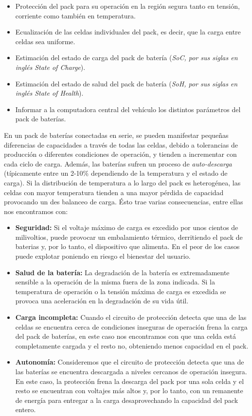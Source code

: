 \documentclass[10pt,a4paper]{article}
\begin{document}
\begin{itemize}
	\item Protección del pack para su operación en la región segura tanto en tensión, corriente como también en temperatura.
	\item Ecualización de las celdas individuales del pack, es decir, que la carga entre celdas sea uniforme.
	\item Estimación del estado de carga del pack de batería (\emph{SoC, por sus siglas en inglés State of Charge}).
	\item Estimación del estado de salud del pack de batería (\emph{SoH, por sus siglas en inglés State of Health}).
	\item Informar a la computadora central del vehículo los distintos parámetros del pack de baterías.
\end{itemize}

\noindent En un pack de baterías conectadas en serie, se pueden manifestar pequeñas diferencias de capacidades a través de todas las celdas, debido a tolerancias de producción o diferentes condiciones de operación, y tienden a incrementar con cada ciclo de carga. Además, las baterías sufren un proceso de \emph{auto-descarga} (típicamente entre un 2-10\% dependiendo de la temperatura y el estado de carga). Si la distribución de temperatura a lo largo del pack es heterogénea, las celdas con mayor temperatura tienden a una mayor pérdida de capacidad provocando un des balanceo de carga. Ésto trae varias consecuencias, entre ellas nos encontramos con:

\begin{itemize}
	\item \textbf{Seguridad:} Si el voltaje máximo de carga es excedido por unos cientos de milivoltios, puede provocar un embalamiento térmico, derritiendo el pack de baterias y, por lo tanto, el dispositivo que alimenta. En el peor de los casos puede explotar poniendo en riesgo el bienestar del usuario.
	\item \textbf{Salud de la batería:} La degradación de la batería es extremadamente sensible a la operación de la misma fuera de la zona indicada. Si la temperatura de operación o la tensión máxima de carga es excedida se provoca una aceleración en la degradación de su vida útil.
	\item \textbf{Carga incompleta:} Cuando el circuito de protección detecta que una de las celdas se encuentra cerca de condiciones inseguras de operación frena la carga del pack de baterías, en este caso nos encontramos con que una celda está completamente cargada y el resto no, obteniendo menos capacidad en el pack.
	\item \textbf{Autonomía:} Consideremos que el circuito de protección detecta que una de las baterías se encuentra descargada a niveles cercanos de operación insegura. En este caso, la protección frena la descarga del pack por una sola celda y el resto se encuentran con voltajes más altos y, por lo tanto, con un remanente de energía para entregar a la carga desaprovechando la capacidad del pack entero.
\end{itemize}
\end{document}
